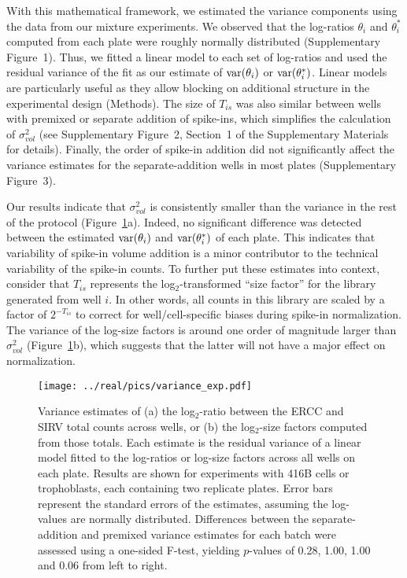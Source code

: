 \documentclass{article}
\newcommand{\suppfignorm}{1}
\newcommand{\suppfigtotals}{2}
\newcommand{\suppfigorder}{3}
\newcommand{\suppsecmath}{1}
\begin{document}
With this mathematical framework, we estimated the variance components using the data from our mixture experiments.
We observed that the log-ratios $\theta_i$ and $\theta^*_i$ computed from each plate were roughly normally distributed (Supplementary Figure~\suppfignorm{}).
Thus, we fitted a linear model to each set of log-ratios and used the residual variance of the fit as our estimate of $\mbox{var}(\theta_i)$ or $\mbox{var}(\theta^*_i)$.
Linear models are particularly useful as they allow blocking on additional structure in the experimental design (Methods).
The size of $T_{is}$ was also similar between wells with premixed or separate addition of spike-ins, which simplifies the calculation of $\sigma^2_{vol}$ (see Supplementary Figure~\suppfigtotals{}, Section~\suppsecmath{} of the Supplementary Materials for details).
Finally, the order of spike-in addition did not significantly affect the variance estimates for the separate-addition wells in most plates (Supplementary Figure~\suppfigorder{}).

Our results indicate that $\sigma^2_{vol}$ is consistently smaller than the variance in the rest of the protocol (Figure~\ref{fig:varestimates}a).
Indeed, no significant difference was detected between the estimated $\mbox{var}(\theta_i)$ and $\mbox{var}(\theta^*_i)$ of each plate.
This indicates that variability of spike-in volume addition is a minor contributor to the technical variability of the spike-in counts.
To further put these estimates into context, consider that $T_{is}$ represents the log$_2$-transformed ``size factor'' for the library generated from well $i$.
In other words, all counts in this library are scaled by a factor of $2^{-T_{is}}$ to correct for well/cell-specific biases during spike-in normalization.
The variance of the log-size factors is around one order of magnitude larger than $\sigma^2_{vol}$ (Figure~\ref{fig:varestimates}b), which suggests that the latter will not have a major effect on normalization.

\begin{figure}[btp]
    \begin{center}
        \texttt{[image: ../real/pics/variance\_exp.pdf]}
    \end{center}
    \caption{Variance estimates of (a) the log$_2$-ratio between the ERCC and SIRV total counts across wells, or (b) the log$_2$-size factors computed from those totals.
        Each estimate is the residual variance of a linear model fitted to the log-ratios or log-size factors across all wells on each plate.
        Results are shown for experiments with 416B cells or trophoblasts, each containing two replicate plates.
        Error bars represent the standard errors of the estimates, assuming the log-values are normally distributed.
        Differences between the separate-addition and premixed variance estimates for each batch were assessed using a one-sided F-test, yielding $p$-values of 0.28, 1.00, 1.00 and 0.06 from left to right.
    }
    \label{fig:varestimates}
\end{figure}
\end{document}
